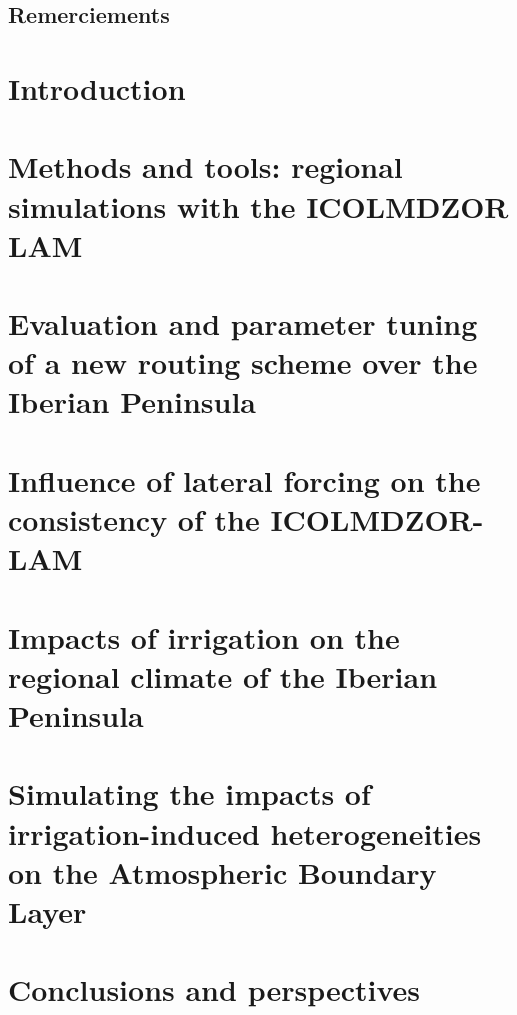\documentclass{report}
\begin{document}
\section*{Remerciements}

\clearpage
\dominitoc
\renewcommand*\contentsname{Contents}
\tableofcontents
\newpage

\chapter{Introduction}
\label{chap:introduction}
\minitoc
\pagebreak
% 

\chapter{Methods and tools: regional simulations with the ICOLMDZOR LAM}
\label{chap:methods}
\minitoc
\pagebreak


\chapter{Evaluation and parameter tuning of a new routing scheme over the Iberian Peninsula}
\label{chap:routing}
\minitoc
\pagebreak
% 

\chapter{Influence of lateral forcing on the consistency of the ICOLMDZOR-LAM}
\label{chap:forcing}
\minitoc
\pagebreak
% 

\chapter{Impacts of irrigation on the regional climate of the Iberian Peninsula}
\label{chap:monthly}
\minitoc
\pagebreak
% 

\chapter{Simulating the impacts of irrigation-induced heterogeneities on the Atmospheric Boundary Layer}
\label{chap:liaise}
\minitoc
\pagebreak
% 

\chapter{Conclusions and perspectives}
% 

% 

\newpage


\end{document}
